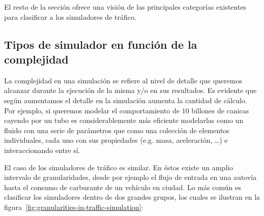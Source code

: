 El resto de la sección ofrece una visión de las principales categorías existentes para clasificar a los simuladores de tráfico.

\subsection{Tipos de simulador en función de la complejidad}

La complejidad en una simulación se refiere al nivel de detalle que queremos alcanzar durante la ejecución de la misma y/o en sus resultados. Es evidente que según aumentamos el detalle en la simulación aumenta la cantidad de cálculo. Por ejemplo, si queremos modelar el comportamiento de $10$ billones de canicas cayendo por un tubo es considerablemente más eficiente modelarlas como un fluido con una serie de parámetros que como una colección de elementos individuales, cada uno con sus propiedades (e.g. masa, aceleración, \ldots) e interaccionando entre sí.

El caso de los simuladores de tráfico es similar. En éstos existe un amplio intervalo de granularidades, desde por ejemplo el flujo de entrada en una autovía hasta el consumo de carburante de un vehículo en ciudad. Lo más común es clasificar los simuladores dentro de dos grandes grupos, los cuales se ilustran en la figura~\ref{fig:granularities-in-traffic-simulation}:

